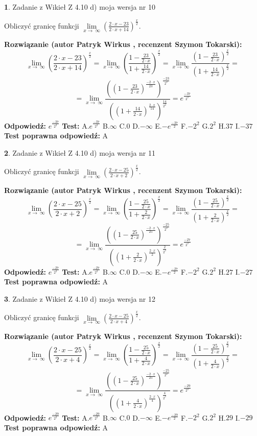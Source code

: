\documentclass[12pt, a4paper]{article}
\theoremstyle{definition} %
\newtheorem{zad}{}
\newcommand{\zadStart}[1]{\begin{zad}#1\newline}
\newcommand{\zadStop}{\end{zad}}
\newcommand{\rozwStart}[2]{\noindent \textbf{Rozwiązanie (autor #1 , recenzent #2): }\newline}
\newcommand{\rozwStop}{\newline}
\newcommand{\odpStart}{\noindent \textbf{Odpowiedź:}\newline}
\newcommand{\odpStop}{\newline}
\newcommand{\testStart}{\noindent \textbf{Test:}\newline}
\newcommand{\testStop}{\newline}
\newcommand{\kluczStart}{\noindent \textbf{Test poprawna odpowiedź:}\newline}
\newcommand{\kluczStop}{\newline}
\begin{document}
\zadStart{Zadanie z Wikieł Z 4.10 d) moja wersja nr 10}


Obliczyć granicę funkcji  $\lim\limits_{x\to\ \infty}(\frac{2\cdot x-23}{2\cdot x+14})^{\frac{x}{2}}$.
\zadStop
\rozwStart{Patryk Wirkus}{Szymon Tokarski}
$$\lim\limits_{x\to\ \infty}(\frac{2\cdot x-23}{2\cdot x+14})^{\frac{x}{2}} = \lim\limits_{x\to\ \infty}(\frac{1-\frac{23}{2\cdot x}}{1+\frac{14}{2\cdot x}})^{\frac{x}{2}}=\lim\limits_{x\to\ \infty}\frac{(1-\frac{23}{2\cdot x})^{\frac{x}{2}}}{(1+\frac{14}{2\cdot x})^{\frac{x}{2}}}=$$
$$=\lim\limits_{x\to\ \infty}\frac{((1-\frac{23}{2\cdot x})^{\frac{-2\cdot x}{23}})^{\frac{-23}{2^{2}}}}{((1+\frac{14}{2\cdot x})^{\frac{2\cdot x}{14}})^{\frac{14}{2^{2}}}}=e^{\frac{-37}{2^{2}}}$$
\rozwStop
\odpStart
$e^{\frac{-37}{2^{2}}}$
\odpStop
\testStart
A.$e^{\frac{-37}{2^{2}}}$ B.$\infty$ C.$0$ D.$-\infty$ E.$-e^{\frac{-37}{2}}$
F.$-2^{2}$ G.$2^{2}$
H.$37$
I.$-37$
\testStop
\kluczStart
A
\kluczStop



\zadStart{Zadanie z Wikieł Z 4.10 d) moja wersja nr 11}


Obliczyć granicę funkcji  $\lim\limits_{x\to\ \infty}(\frac{2\cdot x-25}{2\cdot x+2})^{\frac{x}{2}}$.
\zadStop
\rozwStart{Patryk Wirkus}{Szymon Tokarski}
$$\lim\limits_{x\to\ \infty}(\frac{2\cdot x-25}{2\cdot x+2})^{\frac{x}{2}} = \lim\limits_{x\to\ \infty}(\frac{1-\frac{25}{2\cdot x}}{1+\frac{2}{2\cdot x}})^{\frac{x}{2}}=\lim\limits_{x\to\ \infty}\frac{(1-\frac{25}{2\cdot x})^{\frac{x}{2}}}{(1+\frac{2}{2\cdot x})^{\frac{x}{2}}}=$$
$$=\lim\limits_{x\to\ \infty}\frac{((1-\frac{25}{2\cdot x})^{\frac{-2\cdot x}{25}})^{\frac{-25}{2^{2}}}}{((1+\frac{2}{2\cdot x})^{\frac{2\cdot x}{2}})^{\frac{2}{2^{2}}}}=e^{\frac{-27}{2^{2}}}$$
\rozwStop
\odpStart
$e^{\frac{-27}{2^{2}}}$
\odpStop
\testStart
A.$e^{\frac{-27}{2^{2}}}$ B.$\infty$ C.$0$ D.$-\infty$ E.$-e^{\frac{-27}{2}}$
F.$-2^{2}$ G.$2^{2}$
H.$27$
I.$-27$
\testStop
\kluczStart
A
\kluczStop



\zadStart{Zadanie z Wikieł Z 4.10 d) moja wersja nr 12}


Obliczyć granicę funkcji  $\lim\limits_{x\to\ \infty}(\frac{2\cdot x-25}{2\cdot x+4})^{\frac{x}{2}}$.
\zadStop
\rozwStart{Patryk Wirkus}{Szymon Tokarski}
$$\lim\limits_{x\to\ \infty}(\frac{2\cdot x-25}{2\cdot x+4})^{\frac{x}{2}} = \lim\limits_{x\to\ \infty}(\frac{1-\frac{25}{2\cdot x}}{1+\frac{4}{2\cdot x}})^{\frac{x}{2}}=\lim\limits_{x\to\ \infty}\frac{(1-\frac{25}{2\cdot x})^{\frac{x}{2}}}{(1+\frac{4}{2\cdot x})^{\frac{x}{2}}}=$$
$$=\lim\limits_{x\to\ \infty}\frac{((1-\frac{25}{2\cdot x})^{\frac{-2\cdot x}{25}})^{\frac{-25}{2^{2}}}}{((1+\frac{4}{2\cdot x})^{\frac{2\cdot x}{4}})^{\frac{4}{2^{2}}}}=e^{\frac{-29}{2^{2}}}$$
\rozwStop
\odpStart
$e^{\frac{-29}{2^{2}}}$
\odpStop
\testStart
A.$e^{\frac{-29}{2^{2}}}$ B.$\infty$ C.$0$ D.$-\infty$ E.$-e^{\frac{-29}{2}}$
F.$-2^{2}$ G.$2^{2}$
H.$29$
I.$-29$
\testStop
\kluczStart
A
\kluczStop
\end{document}
